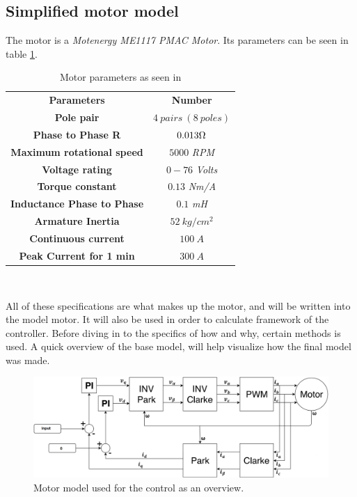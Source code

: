 \subsection{Simplified motor model}
The motor is a \textit{Motenergy ME1117 PMAC Motor}. Its parameters can be seen in table \ref{Motor_parameters_list}.

\begin{table} [H]
    \centering
    \begin{tabular}{|c|c|} \cline{1-2}
        \textbf{Parameters} & \textbf{Number} \\ \cline{1-2}
        \textbf{Pole pair} & $4\ pairs\ (8\ poles)$ \\ \cline{1-2}
        \textbf{Phase to Phase R} & $0.013\ohm$ \\ \cline{1-2}
        \textbf{Maximum rotational speed} & $5000$ \textit{RPM} \\ \cline{1-2}
        \textbf{Voltage rating} & $0-76$ \textit{Volts} \\ \cline{1-2}
        \textbf{Torque constant} & $0.13$ \textit{Nm/A} \\ \cline{1-2}
        \textbf{Inductance Phase to Phase} & $0.1$ \textit{mH} \\ \cline{1-2}
        \textbf{Armature Inertia} & $52\ kg/cm^2$ \\ \cline{1-2}
        \textbf{Continuous current} & $100\ A$ \\ \cline{1-2}
        \textbf{Peak Current for 1 min} & $300\ A$ \\ \cline{1-2}  
    \end{tabular} \\
    \caption{Motor parameters as seen in \cite{Motor_Parameters}}
    \label{Motor_parameters_list}
\end{table} 

All of these specifications are what makes up the motor, and will be written into the model motor. It will also be used in order to calculate framework of the controller. Before diving in to the specifics of how and why, certain methods is used. A quick overview of the base model, will help visualize how the final model was made.\\

\begin{figure} [H]
    \centering
    \includegraphics[scale=0.42]{pictures/control/udklip.PNG}
    \caption{Motor model used for the control as an overview.}
    \label{fig:Motor_model}
\end{figure} 

